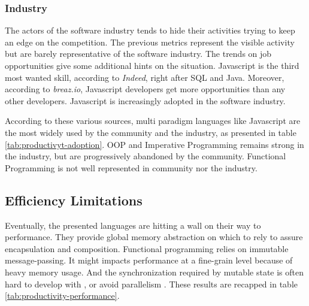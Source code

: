 \subsubsection{Industry}

The actors of the software industry tends to hide their activities trying to keep an edge on the competition.
The previous metrics represent the visible activity but are barely representative of the software industry.
The trends on job opportunities give some additional hints on the situation.
Javascript is the third most wanted skill, according to \textit{Indeed}, right after SQL and Java.
Moreover, according to \textit{breaz.io}, Javascript developers get more opportunities than any other developers.
Javascript is increasingly adopted in the software industry.

\separator

According to these various sources, multi paradigm languages like Javascript are the most widely used by the community and the industry, as presented in table \ref{tab:productivyt-adoption}.
OOP and Imperative Programming remains strong in the industry, but are progressively abandoned by the community.
Functional Programming is not well represented in community nor the industry.



\subsection{Efficiency Limitations} \label{chapter3:software-productivity:efficiency-limitations}

Eventually, the presented languages are hitting a wall on their way to performance.
They provide global memory abstraction on which to rely to assure encapsulation and composition. %
Functional programming relies on immutable message-passing.
It might impacts performance at a fine-grain level because of heavy memory usage.
And the synchronization required by mutable state is often hard to develop with \cite{Adya2002}, or avoid parallelism \cite{Pai1999,Krohn2007}.
These results are recapped in table \ref{tab:productivity-performance}.

